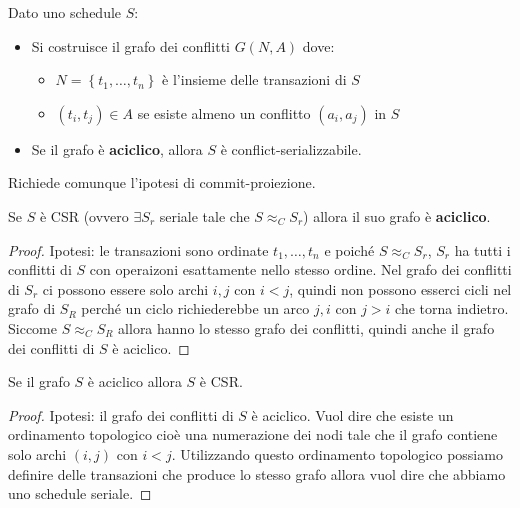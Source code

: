 \documentclass[a4paper]{article}
\begin{document}
Dato uno schedule \( S \):
\begin{itemize}
  \item Si costruisce il grafo dei conflitti \( G(N, A) \) dove:
    \begin{itemize}
      \item \( N = \left\{ t_1, \ldots, t_n \right\} \) è l'insieme delle transazioni
        di \( S \)

      \item \( (t_i, t_j) \in A \) se esiste almeno un conflitto \( (a_i, a_j) \) in
        \( S \)
    \end{itemize}

  \item Se il grafo è \textbf{aciclico}, allora \( S \) è conflict-serializzabile.
\end{itemize}
Richiede comunque l'ipotesi di commit-proiezione.

\thm{}
{
  Se $S$ è CSR (ovvero $\exists S_r$ seriale tale che $S \approx_C S_r$) 
  allora il suo grafo è \textbf{aciclico}. 
}

\begin{proof}
Ipotesi: le transazioni sono ordinate $t_1, \ldots, t_n$ e poiché 
$S \approx_C S_r$, $S_r$ ha tutti i conflitti di $S$ con operaizoni esattamente nello stesso ordine. 
Nel grafo dei conflitti di $S_r$ ci possono essere solo archi $i,j$ 
con $i < j$, quindi non possono esserci cicli nel grafo di $S_R$
perché un ciclo richiederebbe un arco $j,i$ con $j > i$ che torna indietro. 
Siccome $S \approx_C S_R$ allora hanno lo stesso grafo dei conflitti, quindi anche il grafo dei conflitti di 
$S$ è aciclico. 
\end{proof}

\thm{}
{
  Se il grafo $S$ è aciclico allora $S$ è CSR. 
}

\begin{proof}
Ipotesi: il grafo dei conflitti di $S$ è aciclico.
Vuol dire che esiste un ordinamento topologico 
cioè una numerazione dei nodi tale che il grafo contiene solo archi
$(i,j)$ con $i < j$.  
Utilizzando questo ordinamento topologico possiamo definire 
delle transazioni che produce lo stesso grafo 
allora vuol dire che abbiamo uno schedule seriale. 
\end{proof}
\end{document}

